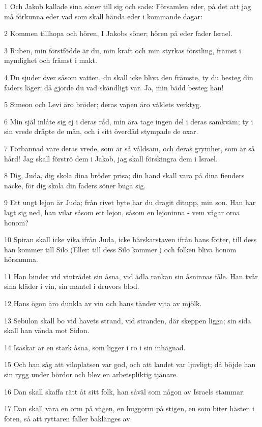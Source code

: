 \par 1 Och Jakob kallade sina söner till sig och sade: Församlen eder, på det att jag må förkunna eder vad som skall hända eder i kommande dagar:
\par 2 Kommen tillhopa och hören, I Jakobs söner; hören på eder fader Israel.
\par 3 Ruben, min förstfödde är du, min kraft och min styrkas förstling, främst i myndighet och främst i makt.
\par 4 Du sjuder över såsom vatten, du skall icke bliva den främste, ty du besteg din faders läger; då gjorde du vad skändligt var. Ja, min bädd besteg han!
\par 5 Simeon och Levi äro bröder; deras vapen äro våldets verktyg.
\par 6 Min själ inlåte sig ej i deras råd, min ära tage ingen del i deras samkväm; ty i sin vrede dräpte de män, och i sitt överdåd stympade de oxar.
\par 7 Förbannad vare deras vrede, som är så våldsam, och deras grymhet, som är så hård! Jag skall förströ dem i Jakob, jag skall förskingra dem i Israel.
\par 8 Dig, Juda, dig skola dina bröder prisa; din hand skall vara på dina fienders nacke, för dig skola din faders söner buga sig.
\par 9 Ett ungt lejon är Juda; från rivet byte har du dragit ditupp, min son. Han har lagt sig ned, han vilar såsom ett lejon, såsom en lejoninna - vem vågar oroa honom?
\par 10 Spiran skall icke vika ifrån Juda, icke härskarstaven ifrån hans fötter, till dess han kommer till Silo (Eller: till dess Silo kommer.) och folken bliva honom hörsamma.
\par 11 Han binder vid vinträdet sin åsna, vid ädla rankan sin åsninnas fåle. Han tvår sina kläder i vin, sin mantel i druvors blod.
\par 12 Hans ögon äro dunkla av vin och hans tänder vita av mjölk.
\par 13 Sebulon skall bo vid havets strand, vid stranden, där skeppen ligga; sin sida skall han vända mot Sidon.
\par 14 Isaskar är en stark åsna, som ligger i ro i sin inhägnad.
\par 15 Och han såg att viloplatsen var god, och att landet var ljuvligt; då böjde han sin rygg under bördor och blev en arbetspliktig tjänare.
\par 16 Dan skall skaffa rätt åt sitt folk, han såväl som någon av Israels stammar.
\par 17 Dan skall vara en orm på vägen, en huggorm på stigen, en som biter hästen i foten, så att ryttaren faller baklänges av.
